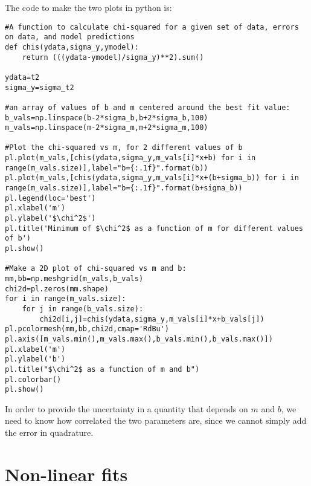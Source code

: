 The code to make the two plots in python is:
\begin{lstlisting}[frame=single] 
#A function to calculate chi-squared for a given set of data, errors on data, and model predictions
def chis(ydata,sigma_y,ymodel):
    return (((ydata-ymodel)/sigma_y)**2).sum()

ydata=t2
sigma_y=sigma_t2

#an array of values of b and m centered around the best fit value:
b_vals=np.linspace(b-2*sigma_b,b+2*sigma_b,100)
m_vals=np.linspace(m-2*sigma_m,m+2*sigma_m,100)
    
#Plot the chi-squared vs m, for 2 different values of b    
pl.plot(m_vals,[chis(ydata,sigma_y,m_vals[i]*x+b) for i in range(m_vals.size)],label="b={:.1f}".format(b))
pl.plot(m_vals,[chis(ydata,sigma_y,m_vals[i]*x+(b+sigma_b)) for i in range(m_vals.size)],label="b={:.1f}".format(b+sigma_b))
pl.legend(loc='best')
pl.xlabel('m')
pl.ylabel('$\chi^2$')
pl.title('Minimum of $\chi^2$ as a function of m for different values of b')
pl.show()

#Make a 2D plot of chi-squared vs m and b:
mm,bb=np.meshgrid(m_vals,b_vals)
chi2d=pl.zeros(mm.shape)
for i in range(m_vals.size):
    for j in range(b_vals.size):
        chi2d[i,j]=chis(ydata,sigma_y,m_vals[i]*x+b_vals[j])
pl.pcolormesh(mm,bb,chi2d,cmap='RdBu')
pl.axis([m_vals.min(),m_vals.max(),b_vals.min(),b_vals.max()])
pl.xlabel('m')
pl.ylabel('b')
pl.title("$\chi^2$ as a function of m and b")
pl.colorbar()
pl.show()
\end{lstlisting} 



In order to provide the uncertainty in a quantity that depends on $m$ and $b$, we need to know how correlated the two parameters are, since we cannot simply add the error in quadrature. 

\section{Non-linear fits}



 